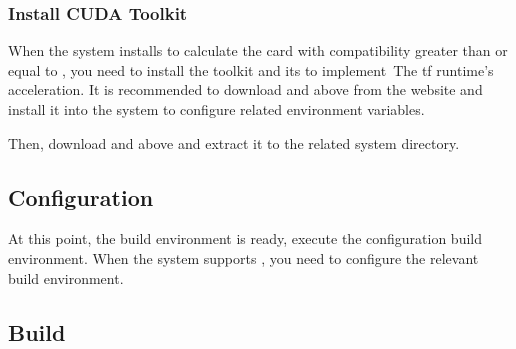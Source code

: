 \begin{content}

\subsubsection{Install CUDA Toolkit}

When the system installs  to calculate the  card with compatibility greater than or equal to , you need to install the  toolkit and its  to implement\ The tf{} runtime's  acceleration. It is recommended to download  and above from the  website and install it into the system to configure related environment variables.


Then, download  and above and extract it to the  related system directory.


\subsection{Configuration}

At this point, the build environment is ready, execute the  configuration build environment. When the system supports , you need to configure the relevant  build environment.


\subsection{Build}


\end{content}
